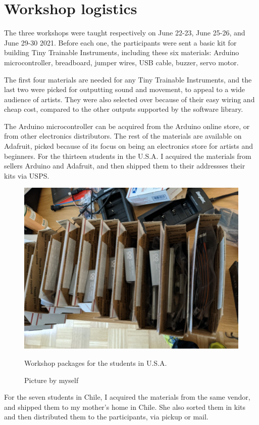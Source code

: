 \section{Workshop logistics}

The three workshops were taught respectively on June 22-23, June 25-26, and June 29-30 2021. Before each one, the participants were sent a basic kit for building Tiny Trainable Instruments, including these six materials: Arduino microcontroller, breadboard, jumper wires, USB cable, buzzer, servo motor.

The first four materials are needed for any Tiny Trainable Instruments, and the last two were picked for outputting sound and movement, to appeal to a wide audience of artists. They were also selected over because of their easy wiring and cheap cost, compared to the other outputs supported by the software library.

The Arduino microcontroller can be acquired from the Arduino online store, or from other electronics distributors. The rest of the materials are available on Adafruit, picked because of its focus on being an electronics store for artists and beginners. For the thirteen students in the U.S.A. I acquired the materials from sellers Arduino and Adafruit, and then shipped them to their addressses their kits via \acrfull{USPS}.

\begin{figure}[ht]
  \centering
  \includegraphics[width=0.75\linewidth,height=0.25\textheight,keepaspectratio]{images/workshop-packages.jpg}
  \caption{Workshop packages for the students in U.S.A.}
  \caption*{Picture by myself}
  \label{fig:workshop-packages-usa}
\end{figure}

For the seven students in Chile, I acquired the materials from the same vendor, and shipped them to my mother's home in Chile. She also sorted them in kits and then distributed them to the participants, via pickup or mail.

